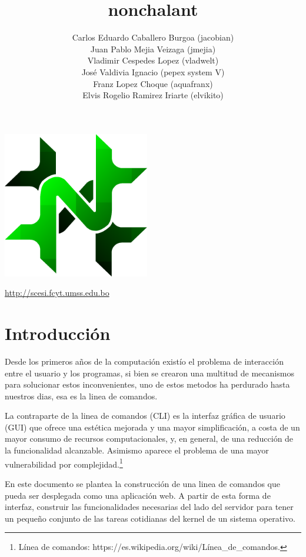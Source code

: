 \documentclass[letterpaper,11pt]{article}
\title{\bf nonchalant}
\author{
    Carlos Eduardo Caballero Burgoa (jacobian) \\
    Juan Pablo Mejia Veizaga (jmejia) \\
    Vladimir Cespedes Lopez (vladwelt) \\
    José Valdivia Ignacio (pepex system V) \\
    Franz Lopez Choque (aquafranx) \\
    Elvis Rogelio Ramirez Iriarte (elvikito) \\
}
\begin{document}
\maketitle
\begin{center}\includegraphics[width=0.48\textwidth]
{nonchalant.png}\end{center}
\begin{center}\url {http://scesi.fcyt.umss.edu.bo}\end{center}
\pagebreak

\tableofcontents
\pagebreak

\section{Introducción}
Desde los primeros años de la computación existío el problema de interacción
entre el usuario y los programas, si bien se crearon una multitud de
mecanismos para solucionar estos inconvenientes, uno de estos metodos ha
perdurado hasta nuestros dias, esa es la linea de comandos.

La contraparte de la linea de comandos (CLI) es la interfaz gráfica de usuario
(GUI) que ofrece una estética mejorada y una mayor simplificación, a costa de
un mayor consumo de recursos computacionales, y, en general, de una reducción
de la funcionalidad alcanzable. Asimismo aparece el problema de una mayor
vulnerabilidad por complejidad.\footnote{Línea de comandos:
https://es.wikipedia.org/wiki/Línea\_de\_comandos.}

En este documento se plantea la construcción de una linea de comandos que
pueda ser desplegada como una aplicación web. A partir de esta forma de
interfaz, construir las funcionalidades necesarias del lado del servidor para
tener un pequeño conjunto de las tareas cotidianas del kernel de un sistema
operativo.
\end{document}
